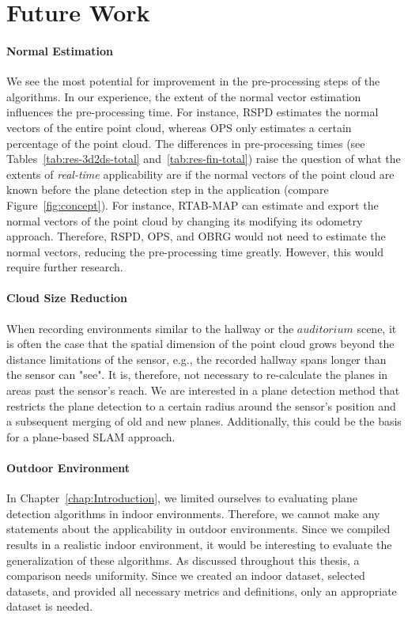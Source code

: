 \documentclass[main.tex]{subfiles}
\begin{document}
\section{Future Work}
\paragraph{Normal Estimation}
We see the most potential for improvement in the pre-processing steps of the algorithms. In our experience, the extent of the normal vector estimation influences the pre-processing time. For instance, RSPD estimates the normal vectors of the entire point cloud, whereas OPS only estimates a certain percentage of the point cloud. The differences in pre-processing times (see Tables~\ref{tab:res-3d2ds-total} and~\ref{tab:res-fin-total}) raise the question of what the extents of \textit{real-time} applicability are if the normal vectors of the point cloud are known before the plane detection step in the application (compare Figure~\ref{fig:concept}). For instance, RTAB-MAP can estimate and export the normal vectors of the point cloud by changing its modifying its odometry approach. Therefore, RSPD, OPS, and OBRG would not need to estimate the normal vectors, reducing the pre-processing time greatly. However, this would require further research.

\paragraph{Cloud Size Reduction}
When recording environments similar to the hallway or the $auditorium$ scene, it is often the case that the spatial dimension of the point cloud grows beyond the distance limitations of the sensor, e.g., the recorded hallway spans longer than the sensor can "see". It is, therefore, not necessary to re-calculate the planes in areas past the sensor's reach. We are interested in a plane detection method that restricts the plane detection to a certain radius around the sensor's position and a subsequent merging of old and new planes. Additionally, this could be the basis for a plane-based SLAM approach.

\paragraph{Outdoor Environment}
In Chapter~\ref{chap:Introduction}, we limited ourselves to evaluating plane detection algorithms in indoor environments. Therefore, we cannot make any statements about the applicability in outdoor environments. Since we compiled results in a realistic indoor environment, it would be interesting to evaluate the generalization of these algorithms. As discussed throughout this thesis, a comparison needs uniformity. Since we created an indoor dataset, selected datasets, and provided all necessary metrics and definitions, only an appropriate dataset is needed.
\end{document}

